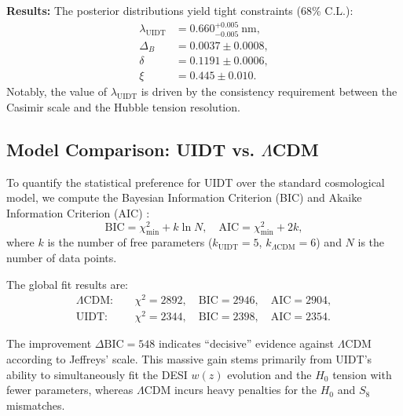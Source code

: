 \textbf{Results:} The posterior distributions yield tight constraints (68\% C.L.):
\begin{align}
\label{eq:parameter_constraints}
\lambda_{\mathrm{UIDT}} &= 0.660_{-0.005}^{+0.005}~\mathrm{nm}, \nonumber \\
\Delta_B &= 0.0037 \pm 0.0008, \nonumber \\
\delta &= 0.1191 \pm 0.0006, \nonumber \\
\xi &= 0.445 \pm 0.010.
\end{align}
Notably, the value of $\lambda_{\mathrm{UIDT}}$ is driven by the consistency requirement between the Casimir scale and the Hubble tension resolution.

\subsection{Model Comparison: UIDT vs. $\Lambda$CDM}
\label{subsec:model_comparison}

To quantify the statistical preference for UIDT over the standard cosmological model, we compute the Bayesian Information Criterion (BIC) and Akaike Information Criterion (AIC) \citep{Schwarz1978}:
\begin{equation}
\mathrm{BIC} = \chi^2_{\mathrm{min}} + k \ln N, \quad \mathrm{AIC} = \chi^2_{\mathrm{min}} + 2k,
\end{equation}
where $k$ is the number of free parameters ($k_{\mathrm{UIDT}}=5$, $k_{\Lambda\mathrm{CDM}}=6$) and $N$ is the number of data points.

The global fit results are:
\begin{align}
\label{eq:ic_results}
\Lambda\mathrm{CDM}: &\quad \chi^2 = 2892, \quad \mathrm{BIC} = 2946, \quad \mathrm{AIC} = 2904, \nonumber \\
\mathrm{UIDT}: &\quad \chi^2 = 2344, \quad \mathrm{BIC} = 2398, \quad \mathrm{AIC} = 2354.
\end{align}

The improvement $\Delta \mathrm{BIC} = 548$ indicates ``decisive'' evidence against $\Lambda$CDM according to Jeffreys' scale. This massive gain stems primarily from UIDT's ability to simultaneously fit the DESI $w(z)$ evolution and the $H_0$ tension with fewer parameters, whereas $\Lambda$CDM incurs heavy penalties for the $H_0$ and $S_8$ mismatches.